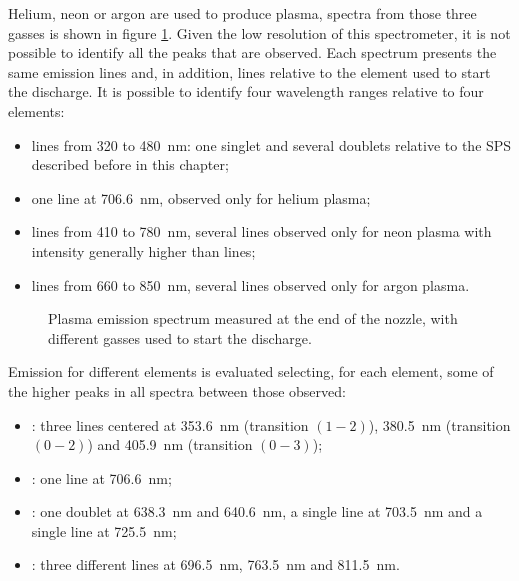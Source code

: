 Helium, neon or argon are used to produce plasma, spectra from those three gasses is shown in figure \ref{fig:specs}. Given the low resolution of this spectrometer, it is not possible to identify all the peaks that are observed. Each spectrum presents the same emission lines and, in addition, lines relative to the element used to start the discharge. It is possible to identify four wavelength ranges relative to four elements:
\begin{itemize}
 \item {} lines from \num{320} to \SI{480}{\nano\meter}: one singlet and several doublets relative to the SPS described before in this chapter; 
 \item one  line at \SI{706.6}{\nano\meter}, observed only for helium plasma;
 \item {} lines from \num{410} to \SI{780}{\nano\meter}, several lines observed only for neon plasma with intensity generally higher than  lines;
 \item {} lines from \num{660} to \SI{850}{\nano\meter}, several lines observed only for argon plasma.
\end{itemize}
\begin{figure}[h]
 \centering
  
  
  \caption{Plasma emission spectrum measured at the end of the nozzle, with different gasses used to start the discharge.}
  \label{fig:specs}
\end{figure}


Emission for different elements is evaluated selecting, for each element, some of the higher peaks in all spectra between those observed:
\begin{itemize}
 \item {} : three lines centered at \SI{353.6}{\nano\meter} (transition $(1-2)$), \SI{380.5}{\nano\meter} (transition $(0-2)$) and \SI{405.9}{\nano\meter} (transition $(0-3)$);
 \item {} : one line at \SI{706.6}{\nano\meter};
 \item {} : one doublet at \SI{638.3}{\nano\meter} and \SI{640.6}{\nano\meter}, a single line at \SI{703.5}{\nano\meter} and a single line at \SI{725.5}{\nano\meter};
 \item {} : three different lines at \SI{696.5}{\nano\meter}, \SI{763.5}{\nano\meter} and \SI{811.5}{\nano\meter}.
\end{itemize}


